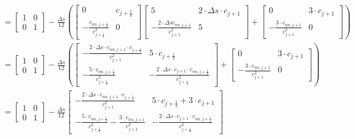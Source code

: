 \documentclass{article}
\begin{document}
\begin{align*}
	                                                 & = \begin{bmatrix} 1 & 0 \\ 0 & 1 \end{bmatrix} - \frac{\Delta s}{12}\left(\begin{bmatrix} 0 & c_{j+\frac{1}{3}} \\ -\frac{c_{nn, j+\frac{1}{3}}}{c_{j+\frac{1}{3}}^2} & 0 \end{bmatrix}\begin{bmatrix}  5 & 2\cdot\Delta s\cdot c_{j+1} \\ -\frac{2\cdot\Delta sc_{nn, j+1}}{c_{j+1}^2} & 5\end{bmatrix} + \begin{bmatrix} 0 & 3\cdot c_{j+1} \\ -\frac{3\cdot c_{nn, j+1}}{c_{j+1}^2} & 0\end{bmatrix}\right)                                                                                                                        \\
	                                                 & = \begin{bmatrix} 1 & 0 \\ 0 & 1 \end{bmatrix} - \frac{\Delta s}{12}\left(\begin{bmatrix} -\frac{2\cdot\Delta s\cdot c_{nn, j+1}\cdot c_{j+\frac{1}{3}}}{c_{j+1}^2} & 5\cdot c_{j+\frac{1}{3}} \\ -\frac{5\cdot c_{nn, j+\frac{1}{3}}}{c_{j+\frac{1}{3}}^2} & - \frac{2\cdot\Delta s\cdot c_{j+1}\cdot c_{nn, j+\frac{1}{3}}}{c_{j+\frac{1}{3}}^2} \end{bmatrix} + \begin{bmatrix} 0 & 3\cdot c_{j+1} \\ -\frac{3\cdot c_{nn, j+1}}{c_{j+1}^2} & 0\end{bmatrix}\right) \\
	                                                 & = \begin{bmatrix} 1 & 0 \\ 0 & 1 \end{bmatrix} - \frac{\Delta s}{12}\begin{bmatrix} -\frac{2\cdot\Delta s\cdot c_{nn, j+1}\cdot c_{j+\frac{1}{3}}}{c_{j+1}^2} & 5\cdot c_{j+\frac{1}{3}} + 3\cdot c_{j+1} \\ -\frac{5\cdot c_{nn, j+\frac{1}{3}}}{c_{j+\frac{1}{3}}^2} - \frac{3\cdot c_{nn, j+1}}{c_{j+1}^2} & - \frac{2\cdot\Delta s\cdot c_{j+1}\cdot c_{nn, j+\frac{1}{3}}}{c_{j+\frac{1}{3}}^2} \end{bmatrix}                                                     \\

\end{align*}
\end{document}
